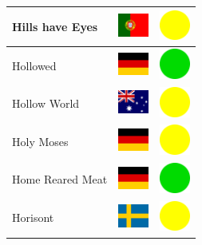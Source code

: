\documentclass[12pt, a4paper, twoside]{report}
\begin{document}
\begin{center}
\begin{longtable}{|p{5cm}|p{2cm}|p{2cm}|}
 Hills have Eyes                                            & \includegraphics[width=1cm]{../img/flags/pt} &   \includegraphics[width=1cm]{../likes/m} \\ \hline
 Hollowed                                                   & \includegraphics[width=1cm]{../img/flags/de} &   \includegraphics[width=1cm]{../likes/y} \\ \hline
 Hollow World                                               & \includegraphics[width=1cm]{../img/flags/au} &   \includegraphics[width=1cm]{../likes/m} \\ \hline
 Holy Moses                                                 & \includegraphics[width=1cm]{../img/flags/de} &   \includegraphics[width=1cm]{../likes/m} \\ \hline
 Home Reared Meat                                           & \includegraphics[width=1cm]{../img/flags/de} &   \includegraphics[width=1cm]{../likes/y} \\ \hline
 Horisont                                                   & \includegraphics[width=1cm]{../img/flags/se} &   \includegraphics[width=1cm]{../likes/m} \\ \hline

\end{longtable}
\end{center}
\end{document}
